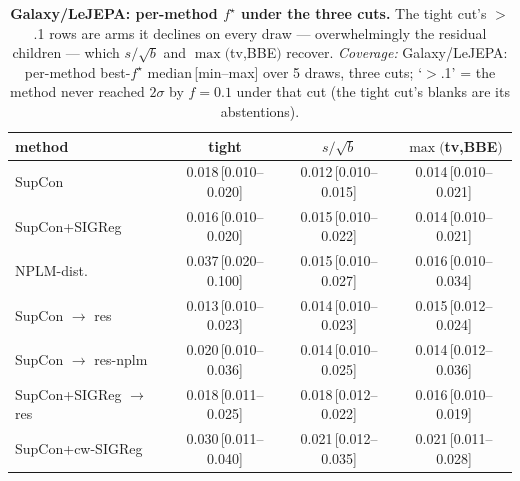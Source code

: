 \begin{table}[t]
\centering
\footnotesize
\begin{tabular}{lccc}
\toprule
method & tight & $s/\sqrt{b}$ & $\max($tv,BBE$)$ \\
\midrule
SupCon & 0.018\,[0.010--0.020] & 0.012\,[0.010--0.015] & 0.014\,[0.010--0.021] \\
SupCon+SIGReg & 0.016\,[0.010--0.020] & 0.015\,[0.010--0.022] & 0.014\,[0.010--0.021] \\
NPLM-dist. & 0.037\,[0.020--0.100] & 0.015\,[0.010--0.027] & 0.016\,[0.010--0.034] \\
\quad SupCon $\to$ res & 0.013\,[0.010--0.023] & 0.014\,[0.010--0.023] & 0.015\,[0.012--0.024] \\
\quad SupCon $\to$ res-nplm & 0.020\,[0.010--0.036] & 0.014\,[0.010--0.025] & 0.014\,[0.012--0.036] \\
\quad SupCon+SIGReg $\to$ res & 0.018\,[0.011--0.025] & 0.018\,[0.012--0.022] & 0.016\,[0.010--0.019] \\
SupCon+cw-SIGReg & 0.030\,[0.011--0.040] & 0.021\,[0.012--0.035] & 0.021\,[0.011--0.028] \\
\bottomrule
\end{tabular}
\caption{\textbf{Galaxy/LeJEPA: per-method $f^\star$ under the three cuts.}  The tight cut's $>$.1 rows are arms it declines on every draw --- overwhelmingly the residual children --- which $s/\sqrt{b}$ and $\max($tv,BBE$)$ recover. \emph{Coverage:} Galaxy/LeJEPA: per-method best-$f^\star$ median\,[min--max] over 5 draws, three cuts; `$>$.1' = the method never reached $2\sigma$ by $f{=}0.1$ under that cut (the tight cut's blanks are its abstentions).}
\label{tab:cut_perarm_galaxy_lejepa}
\end{table}
